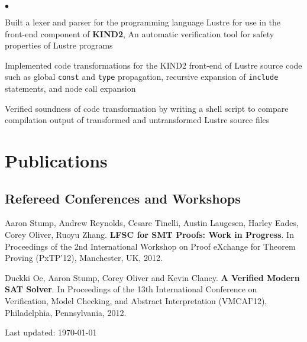 \documentclass[10pt,letterpaper]{article}
\renewenvironment{itemize}{
  \begin{list}{}{
      \setlength{\leftmargin}{1.5em}
      \setlength{\itemsep}{0.25em}
      \setlength{\parskip}{0pt}
      \setlength{\parsep}{0.25em}
    }
  }{
  \end{list}
}
\newenvironment{bitemize}{
  \begin{list}{\(\bullet \)}{
      \setlength{\leftmargin}{1.5em}
      \setlength{\itemsep}{0.25em}
      \setlength{\parskip}{0pt}
      \setlength{\parsep}{0.25em}
    }
  }{
  \end{list}
}
\begin{document}
\begin{itemize}
\begin{bitemize}
          \item Built a lexer and parser for the programming language Lustre for use in
          the front-end component of \textbf{KIND2}, An automatic verification tool
          for safety properties of Lustre programs
          \item Implemented code transformations for the KIND2 front-end of Lustre
          source code such as global \texttt{const} and \texttt{type} propagation,
          recursive expansion of \texttt{include} statements, and node call expansion
          \item Verified soundness of code transformation by writing a shell script to
          compare compilation output of transformed and untransformed Lustre source
          files
        \end{bitemize}
\end{itemize}

\section*{Publications}

\subsection*{Refereed Conferences and Workshops}

\begin{itemize}
  {\item Aaron Stump, Andrew Reynolds, Cesare Tinelli, Austin Laugesen, Harley
        Eades, Corey Oliver, Ruoyu Zhang. \textbf{LFSC for SMT Proofs: Work in
          Progress}. In Proceedings of the 2nd International Workshop on Proof
        eXchange for Theorem Proving (PxTP'12), Manchester, UK, 2012.}
\end{itemize}

\begin{itemize}
  {\item Duckki Oe, Aaron Stump, Corey Oliver and Kevin Clancy. \textbf{A
          Verified Modern SAT Solver}. In Proceedings of the 13th International
        Conference on Verification, Model Checking, and Abstract Interpretation
        (VMCAI'12), Philadelphia, Pennsylvania, 2012.}
\end{itemize}

\medskip

\begin{center}
  \begin{small}
    Last updated: \today
  \end{small}
\end{center}
\end{document}
